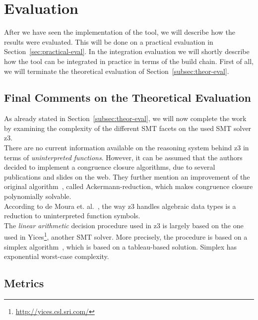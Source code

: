 
\chapter{Evaluation}\label{chap:evaluation}

After we have seen the implementation of the tool, we will describe how the results were evaluated. This will be done on a practical evaluation in Section~\ref{sec:practical-eval}. In the integration evaluation we will shortly describe how the tool can be integrated in practice in terms of the build chain. First of all, we will terminate the theoretical evaluation of Section~\ref{subsec:theor-eval}.


\section{Final Comments on the Theoretical Evaluation}

As already stated in Section~\ref{subsec:theor-eval}, we will now complete the work by examining the complexity of the different S{\tiny M}T facets on the used SMT solver z3. \\

There are no current information available on the reasoning system behind z3 in terms of \emph{uninterpreted functions}. However, it can be assumed that the authors decided to implement a congruence closure algorithms, due to several publications and slides on the web. They further 
mention an improvement of the original algorithm~\cite{z3-solver}, called Ackermann-reduction, which makes congruence closure polynomially solvable.\\

According to de Moura et. al.~\cite{tractability}, the way z3 handles algebraic data types is a reduction to uninterpreted function symbols.\\

The \emph{linear arithmetic} decision procedure used in z3 is largely based on the one used in Yices\footnote{\url{http://yices.csl.sri.com/}}, another SMT solver. More precisely, the procedure is based on a simplex algorithm~\cite{lin-arith}, which is based on a tableau-based solution. Simplex has exponential worst-case complexity. 


\section{Metrics}\label{sec:metrics}

